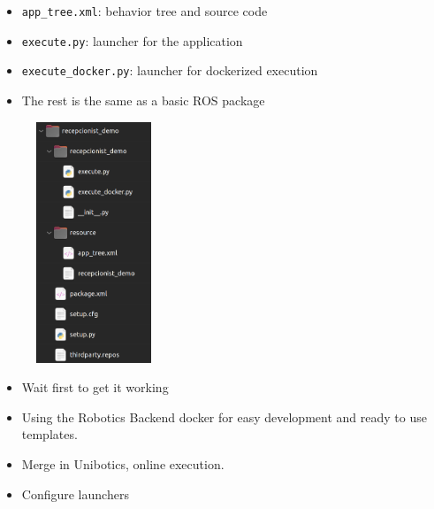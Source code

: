 \documentclass[notes,slidesec,a4]{seminar}
\begin{document}
\begin{hslide}
 \newpage
  \begin{minipage}[t]{7cm}
	\vspace{2cm}
  	\begin{itemize}
	  	\item \texttt{app\_tree.xml}: behavior tree and source code
		\item \texttt{execute.py}: launcher for the application
		\item \texttt{execute\_docker.py}: launcher for dockerized execution
		\item The rest is the same as a basic ROS package
	\end{itemize}
  \end{minipage}
  \begin{minipage}[t]{5cm}
  	\begin{figure}
  		\centerline{\includegraphics[height=7.2cm]{figs/package-struct.png}}
  	\end{figure}
  \end{minipage}
 
 \newpage
 \begin{itemize}
 	\item Wait first to get it working
 	\item Using the Robotics Backend docker for easy development and ready to use templates.
\end{itemize} 
\end{hslide}

\begin{hslide}
  \begin{itemize}
  \item Merge in Unibotics, online execution.
  \item Configure launchers
  \end{itemize}
\end{hslide}
\end{document}
